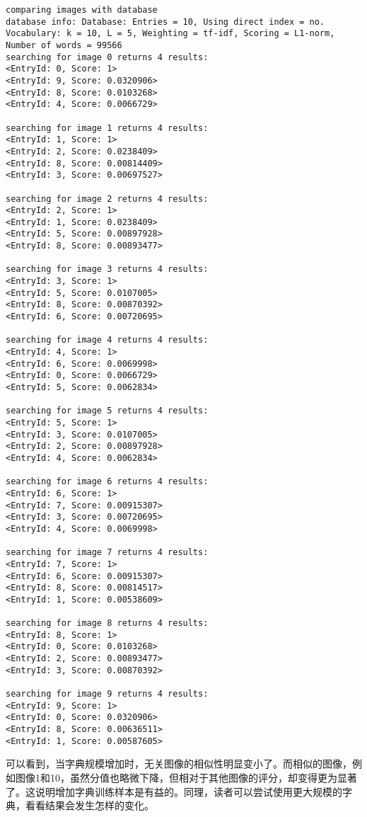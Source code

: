 \begin{lstlisting}
comparing images with database 
database info: Database: Entries = 10, Using direct index = no. Vocabulary: k = 10, L = 5, Weighting = tf-idf, Scoring = L1-norm, Number of words = 99566
searching for image 0 returns 4 results:
<EntryId: 0, Score: 1>
<EntryId: 9, Score: 0.0320906>
<EntryId: 8, Score: 0.0103268>
<EntryId: 4, Score: 0.0066729>

searching for image 1 returns 4 results:
<EntryId: 1, Score: 1>
<EntryId: 2, Score: 0.0238409>
<EntryId: 8, Score: 0.00814409>
<EntryId: 3, Score: 0.00697527>

searching for image 2 returns 4 results:
<EntryId: 2, Score: 1>
<EntryId: 1, Score: 0.0238409>
<EntryId: 5, Score: 0.00897928>
<EntryId: 8, Score: 0.00893477>

searching for image 3 returns 4 results:
<EntryId: 3, Score: 1>
<EntryId: 5, Score: 0.0107005>
<EntryId: 8, Score: 0.00870392>
<EntryId: 6, Score: 0.00720695>

searching for image 4 returns 4 results:
<EntryId: 4, Score: 1>
<EntryId: 6, Score: 0.0069998>
<EntryId: 0, Score: 0.0066729>
<EntryId: 5, Score: 0.0062834>

searching for image 5 returns 4 results:
<EntryId: 5, Score: 1>
<EntryId: 3, Score: 0.0107005>
<EntryId: 2, Score: 0.00897928>
<EntryId: 4, Score: 0.0062834>

searching for image 6 returns 4 results:
<EntryId: 6, Score: 1>
<EntryId: 7, Score: 0.00915307>
<EntryId: 3, Score: 0.00720695>
<EntryId: 4, Score: 0.0069998>

searching for image 7 returns 4 results:
<EntryId: 7, Score: 1>
<EntryId: 6, Score: 0.00915307>
<EntryId: 8, Score: 0.00814517>
<EntryId: 1, Score: 0.00538609>

searching for image 8 returns 4 results:
<EntryId: 8, Score: 1>
<EntryId: 0, Score: 0.0103268>
<EntryId: 2, Score: 0.00893477>
<EntryId: 3, Score: 0.00870392>

searching for image 9 returns 4 results:
<EntryId: 9, Score: 1>
<EntryId: 0, Score: 0.0320906>
<EntryId: 8, Score: 0.00636511>
<EntryId: 1, Score: 0.00587605>
\end{lstlisting}

可以看到，当字典规模增加时，无关图像的相似性明显变小了。而相似的图像，例如图像1和10，虽然分值也略微下降，但相对于其他图像的评分，却变得更为显著了。这说明增加字典训练样本是有益的。同理，读者可以尝试使用更大规模的字典，看看结果会发生怎样的变化。

